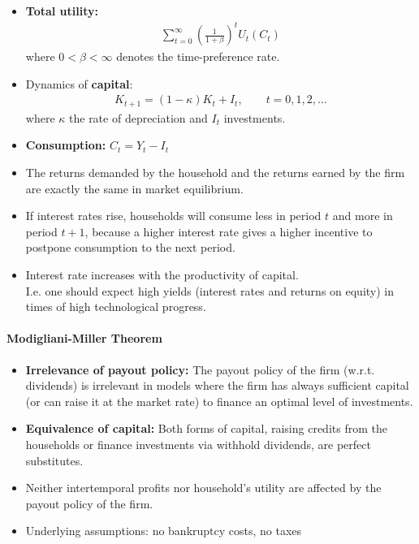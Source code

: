 \documentclass[a4paper,landscape,7pt,fleqn]{scrartcl}
\renewcommand{\emph}[1]{\textbf{#1}}
\begin{document}
\begin{multicols*}{3}
\begin{itemize}
\item \emph{Total utility:}
\begin{align*}
\sum_{t=0}^\infty \left( \frac{1}{1+\beta} \right)^t U_t(C_t)
\end{align*}
where $0<\beta<\infty$ denotes the time-preference rate.
\item Dynamics of \emph{capital}:
\begin{align*}
K_{t+1} = (1-\kappa) K_t + I_t, \qquad t = 0,1,2,\ldots
\end{align*}
where $\kappa$ the rate of depreciation and $I_t$ investments.
\item \emph{Consumption:} $C_t = Y_t - I_t$
\item The returns demanded by the household and the returns earned by the firm are exactly the same in market equilibrium.
\item If interest rates rise, households will consume less in period $t$ and more in period $t+1$, because a higher interest rate gives a higher incentive to postpone consumption to the next period.
\item Interest rate increases with the productivity of capital. \\
I.e. one should expect high yields (interest rates and returns on equity) in times of high technological progress.
\end{itemize}

\paragraph{Modigliani-Miller Theorem}

\begin{itemize}
\item \emph{Irrelevance of payout policy:} The payout policy of the firm (w.r.t. dividends) is irrelevant in models where the firm has always sufficient capital (or can raise it at the market rate) to finance an optimal level of investments.
\item  \emph{Equivalence of capital:} Both forms of capital, raising credits from the households or finance investments via withhold dividends, are perfect substitutes.
\item Neither intertemporal profits nor household's utility are affected by the payout policy of the firm.
\item Underlying assumptions: no bankruptcy costs, no taxes
\end{itemize}


\end{multicols*}
\end{document}

